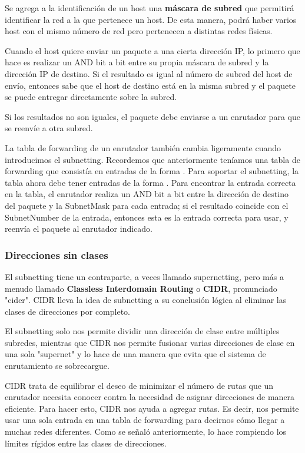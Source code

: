 Se agrega a la identificación de un host una \textbf{máscara de subred} que permitirá identificar la red a la que pertenece un host. De esta manera, podrá haber varios host con el mismo número de red pero pertenecen a distintas redes físicas. 

Cuando el host quiere enviar un paquete a una cierta dirección IP, lo primero que hace es realizar un AND bit a bit entre su propia máscara de subred y la dirección IP de destino. Si el resultado es igual al número de subred del host de envío, entonces sabe que el host de destino está en la misma subred y el paquete se puede entregar directamente sobre la subred.

Si los resultados no son iguales, el paquete debe enviarse a un enrutador para que se reenvíe a otra subred.

La tabla de forwarding de un enrutador también cambia ligeramente cuando introducimos el subnetting. Recordemos que anteriormente teníamos una tabla de forwarding que consistía en entradas de la forma \(<NetworkNum, NextHop>\). Para soportar el subnetting, la tabla ahora debe tener entradas de la forma \(<SubnetNumber, SubnetMask, NextHop>\). Para encontrar la entrada correcta en la tabla, el enrutador realiza un AND bit a bit entre la dirección de destino del paquete y la SubnetMask para cada entrada; si el resultado coincide con el SubnetNumber de la entrada, entonces esta es la entrada correcta para usar, y reenvía el paquete al enrutador indicado.

\subsubsection{Direcciones sin clases}
El subnetting tiene un contraparte, a veces llamado supernetting, pero más a menudo llamado \textbf{Classless Interdomain Routing} o \textbf{CIDR}, pronunciado "cider". CIDR lleva la idea de subnetting a su conclusión lógica al eliminar las clases de direcciones por completo. 

El subnetting solo nos permite dividir una dirección de clase entre múltiples subredes, mientras que CIDR nos permite fusionar varias direcciones de clase en una sola "supernet" y lo hace de una manera que evita que el sistema de enrutamiento se sobrecargue.


CIDR trata de equilibrar el deseo de minimizar el número de rutas que un enrutador necesita conocer contra la necesidad de asignar direcciones de manera eficiente. Para hacer esto, CIDR nos ayuda a agregar rutas. Es decir, nos permite usar una sola entrada en una tabla de forwarding para decirnos cómo llegar a muchas redes diferentes. Como se señaló anteriormente, lo hace rompiendo los límites rígidos entre las clases de direcciones.

